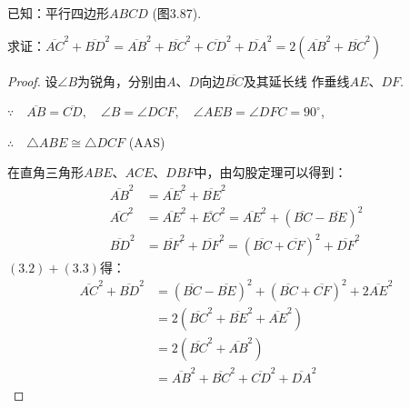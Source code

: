 已知：平行四边形$ABCD$ (图3.87). 

求证：$\overline{AC}^2+\overline{BD}^2=\overline{AB}^2+\overline{BC}^2+\overline{CD}^2+\overline{DA}^2=2\left(\overline{AB}^2+\overline{BC}^2\right)$

\begin{proof}
    设$\angle B$为锐角，分别由$A$、$D$向边$\overline{BC}$及其延长线
    作垂线$AE$、$DF$.

$\because\quad \overline{AB}=\overline{CD},\quad \angle B=\angle DCF,\quad \angle AEB=\angle DFC=90^{\circ}$,

$\therefore\quad \triangle ABE\cong \triangle DCF$ (AAS)

    在直角三角形$ABE$、$ACE$、$DBF$中，由勾股定理可以得到：
\begin{align}
    \overline{AB}^2&=\overline{AE}^2+\overline{BE}^2\\
    \overline{AC}^2&=\overline{AE}^2+\overline{EC}^2=\overline{AE}^2+\left(\overline{BC}-\overline{BE}\right)^2\\
    \overline{BD}^2&=\overline{BF}^2+\overline{DF}^2=\left(\overline{BC}+\overline{CF}\right)^2+\overline{DF}^2
\end{align}
$(3.2)+(3.3)$得：
\[\begin{split}
    \overline{AC}^2+\overline{BD}^2&=\left(\overline{BC}-\overline{BE}\right)^2+\left(\overline{BC}+\overline{CF}\right)^2+2\overline{AE}^2\\
    &=2\left(\overline{BC}^2+\overline{BE}^2+\overline{AE}^2\right)\\
    &=2\left(\overline{BC}^2+\overline{AB}^2\right)\\
    &=\overline{AB}^2+\overline{BC}^2+\overline{CD}^2+\overline{DA}^2
\end{split}\]
\end{proof}

\begin{figure}[htp]\centering
    \begin{minipage}[t]{0.48\textwidth}
    \centering
{}
    \caption{}
    \end{minipage}
    \begin{minipage}[t]{0.48\textwidth}
    \centering
    \caption{}
    \end{minipage}
    \end{figure}

